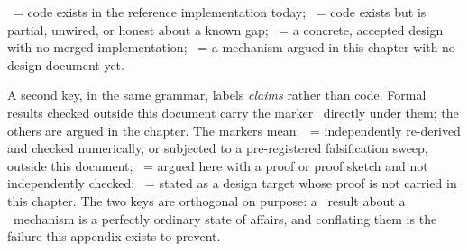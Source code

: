 \documentclass[11pt,a4paper]{article}
\theoremstyle{definition}
\theoremstyle{plain}
\begin{document}
\smallskip
\noindent\Built\ = code exists in the reference implementation today; \BuiltWeak\ =
code exists but is partial, unwired, or honest about a known gap; \Designed\ = a
concrete, accepted design with no merged implementation; \Vision\ = a mechanism argued
in this chapter with no design document yet.

\smallskip
\noindent A second key, in the same grammar, labels \emph{claims} rather than code.
Formal results checked outside this document carry the marker \Verified\ directly
under them; the others are argued in the chapter. The markers mean:
\Verified\ = independently re-derived and checked numerically, or subjected to a
pre-registered falsification sweep, outside this document; \Proved\ = argued here with
a proof or proof sketch and not independently checked; \Unproved\ = stated as a design
target whose proof is not carried in this chapter. The two keys are orthogonal on
purpose: a \Verified\ result about a \Vision\ mechanism is a perfectly ordinary
state of affairs, and conflating them is the failure this appendix exists to prevent.
\end{document}
